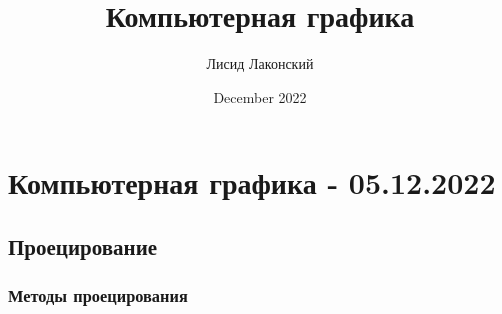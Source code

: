 \documentclass{article}
\title{Компьютерная графика}
\author{Лисид Лаконский}
\date{December 2022}
\begin{document}
\maketitle
\tableofcontents
\pagebreak

\section{Компьютерная графика - 05.12.2022}

\subsection{Проецирование}

\subsubsection{Методы проецирования}
\end{document}
